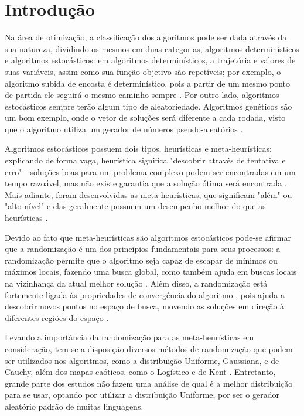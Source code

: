 \chapter{Introdução}
\label{cap:introducao}

Na área de otimização, a classificação dos algoritmos pode ser dada através da sua natureza, dividindo os mesmos em duas categorias, algoritmos determinísticos e algoritmos estocásticos: em algoritmos determinísticos, a trajetória e valores de suas variáveis, assim como sua função objetivo são repetíveis; por exemplo, o algoritmo subida de encosta é determinístico, pois a partir de um mesmo ponto de partida ele seguirá o mesmo caminho sempre \cite{yang}. Por outro lado, algoritmos estocásticos sempre terão algum tipo de aleatoriedade. Algoritmos genéticos são um bom exemplo, onde o vetor de soluções será diferente a cada rodada, visto que o algoritmo utiliza um gerador de números pseudo-aleatórios \cite{yang}.

Algoritmos estocásticos possuem dois tipos, heurísticas e meta-heurísticas: explicando de forma vaga, heurística significa "descobrir através de tentativa e erro" \- - soluções boas para um problema complexo podem ser encontradas em um tempo razoável, mas não existe garantia que a solução ótima será encontrada \cite{yang}. Mais adiante, foram desenvolvidas as meta-heurísticas, que significam "além" \- ou "alto-nível" \- e elas geralmente possuem um desempenho melhor do que as heurísticas \cite{yang}.

Devido ao fato que meta-heurísticas são algoritmos estocásticos pode-se afirmar que a randomização é um dos princípios fundamentais para seus processos: a randomização permite que o algoritmo seja capaz de escapar de mínimos ou máximos locais, fazendo uma busca global, como também ajuda em buscas locais na vizinhança da atual melhor solução \cite{yang2}. Além disso, a randomização está fortemente ligada às propriedades de convergência do algoritmo \cite{caponetto}, pois ajuda a descobrir novos pontos no espaço de busca, movendo as soluções em direção à diferentes regiões do espaço \cite{fister}.

Levando a importância da randomização para as meta-heurísticas em consideração, tem-se a disposição diversos métodos de randomização que podem ser utilizados nos algoritmos, como a distribuição Uniforme, Gaussiana, e de Cauchy, além dos mapas caóticos, como o Logístico e de Kent \cite{fister}. Entretanto, grande parte dos estudos não fazem uma análise de qual é a melhor distribuição para se usar, optando por utilizar a distribuição Uniforme, por ser o gerador aleatório padrão de muitas linguagens.


